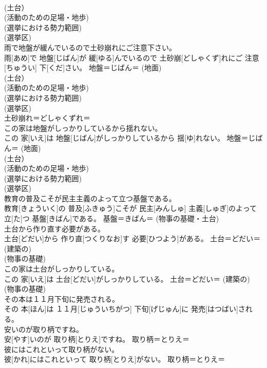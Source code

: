 \documentclass[8pt]{extreport}
\begin{document}
\begin{CJK}{UTF8}{min}
{\\	(土台）
\\	(活動のための足場・地歩) 
\\	(選挙における勢力範囲) 
\\	(選挙区) 
\\	雨で地盤が緩んでいるので土砂崩れにご注意下さい。	
\\	雨[あめ]で 地盤[じばん]が 緩[ゆる]んでいるので 土砂崩[どしゃくず]れにご 注意[ちゅうい] 下[くだ]さい。	地盤＝じばん＝ (地面) 
\\	(土台）
\\	(活動のための足場・地歩) 
\\	(選挙における勢力範囲) 
\\	(選挙区) 
\\	土砂崩れ＝どしゃくずれ＝ 
\\	この家は地盤がしっかりしているから揺れない。	
\\	この 家[いえ]は 地盤[じばん]がしっかりしているから 揺[ゆ]れない。	地盤＝じばん＝ (地面) 
\\	(土台）
\\	(活動のための足場・地歩) 
\\	(選挙における勢力範囲) 
\\	(選挙区) 
\\	教育の普及こそが民主主義のよって立つ基盤である。	
\\	教育[きょういく]の 普及[ふきゅう]こそが 民主[みんしゅ] 主義[しゅぎ]のよって 立[た]つ 基盤[きばん]である。	基盤＝きばん＝ (物事の基礎・土台) 
\\	土台から作り直す必要がある。	
\\	土台[どだい]から 作り直[つくりなお]す 必要[ひつよう]がある。	土台＝どだい＝ (建築の) 
\\	(物事の基礎) 
\\	この家は土台がしっかりしている。	
\\	この 家[いえ]は 土台[どだい]がしっかりしている。	土台＝どだい＝ (建築の) 
\\	(物事の基礎) 
\\	その本は１１月下旬に発売される。	
\\	その 本[ほん]は １１月[じゅういちがつ] 下旬[げじゅん]に 発売[はつばい]される。	
\\	安いのが取り柄ですね。	
\\	安[やす]いのが 取り柄[とりえ]ですね。	取り柄＝とりえ＝ 
\\	彼にはこれといって取り柄がない。	
\\	彼[かれ]にはこれといって 取り柄[とりえ]がない。	取り柄＝とりえ＝ 
}
\end{CJK}
\end{document}
